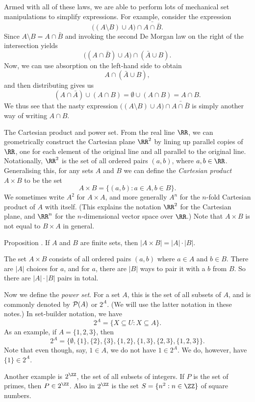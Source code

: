 Armed with all of these laws, we are able to perform lots of mechanical set manipulations to simplify
expressions. For example, consider the expression
$$\bigl( (A\setminus B)\cup A\bigr) \cap \bar{A\cap \bar B}.$$
Since $A\setminus B = A\cap \bar B$ and invoking the second De Morgan law on the right of the intersection
yields
$$\bigl( (A\cap \bar B)\cup A\bigr) \cap (\bar A \cup B).$$
Now, we can use absorption on the left-hand side to obtain
$$A \cap (\bar A \cup B),$$
and then distributing gives us
$$(A\cap \bar A) \cup (A\cap B) = \emptyset \cup (A\cap B) = A\cap B.$$
We thus see that the nasty expression $\bigl( (A\setminus B)\cup A\bigr) \cap \bar{A\cap \bar B}$ is
simply another way of writing $A\cap B$.

\medskip\boldlabel The Cartesian product and power set. From the real line $\RR$, we can geometrically construct
the Cartesian plane $\RR^2$ by lining up parallel copies of $\RR$, one for each element of the original line
and all parallel to the original line.
Notationally, $\RR^2$ is the set of all ordered pairs $(a,b)$, where $a,b\in \RR$. Generalising this,
for any sets $A$ and $B$ we can define the {\it Cartesian product} $A\times B$
to be the set
$$A \times B = \bigl\{ (a,b) : a\in A, b\in B\bigr\}.$$
We sometimes write $A^2$ for $A\times A$, and more generally $A^n$ for the $n$-fold Cartesian product
of $A$ with itself. (This explains the notation $\RR^2$ for the Cartesian plane, and $\RR^n$ for the
$n$-dimensional vector space over $\RR$.)
Note that $A\times B$ is not equal to $B\times A$ in general.

\proclaim Proposition \advthm. If $A$ and $B$ are finite sets, then $|A\times B| = |A|\cdot |B|$.

\proof The set $A\times B$ consists of all ordered pairs $(a,b)$ where $a\in A$ and $b\in B$. There are
$|A|$ choices for $a$, and for $a$, there are $|B|$ ways to pair it with a $b$ from $B$. So there
are $|A|\cdot |B|$ pairs in total.\slug

Now we define the {\it power set}. For a set $A$, this is the set of all subsets of $A$, and is
commonly denoted by ${\cal P}(A)$ or $2^A$. (We will use the latter notation in these notes.)
In set-builder notation, we have
$$2^A = \{X\subseteq U : X\subseteq A\}.$$
As an example, if $A = \{1,2,3\}$, then
$$2^A = \bigl\{\emptyset, \{1\}, \{2\}, \{3\}, \{1,2\}, \{1,3\}, \{2,3\}, \{1,2,3\}\bigr\}.$$
Note that even though, say, $1\in A$, we do not have $1\in 2^A$. We do, however, have $\{1\}\in 2^A$.

Another example is $2^\ZZ$, the set of all subsets of integers. If $P$ is the set of primes, then
$P\in 2^\ZZ$. Also in $2^\ZZ$ is the set $S = \{n^2 : n\in \ZZ\}$ of square numbers.

